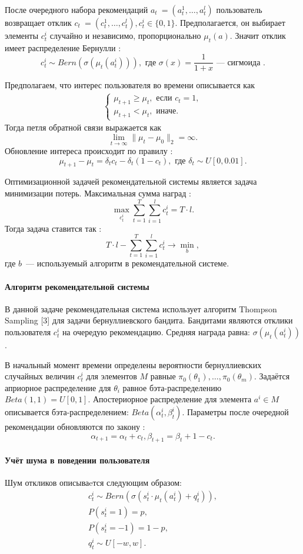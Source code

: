 \documentclass[12pt, twoside]{article}
\begin{document}
После очередного набора рекомендаций $a_t~= (a_t^1, \dots, a_t^l)$ пользователь возвращает $\textit{отклик}$ $c_t~= (c_t^1, \dots, c_t^l), c_t^i \in \{0, 1\}$. 
Предполагается, он выбирает элементы $c_t^i$ случайно и независимо, пропорционально $\mu_t(a)$.
Значит отклик имеет распределение Бернулли : 
\[c_t^i \sim Bern (\sigma(\mu_t(a_t^i))), \text{ где } \sigma(x) = \frac{1}{1+x}\text{~--- сигмоида }. \] 

Предполагаем, что интерес пользователя во времени описывается как 
\begin{gather*}
  \begin{cases}
    \mu_{t+1} \geq \mu_{t}, \text{ если } c_t = 1,  \\
    \mu_{t+1} < \mu_{t}, \text{ иначе}. 
  \end{cases}
\end{gather*}
Тогда петля обратной связи выражается как \[ \lim_{t \to \infty} \|\mu_t - \mu_0 \|_2 = \infty. \]
Обновление интереса происходит по правилу : 
\[\mu_{t+1} - \mu_{t} = \delta_t c_t - \delta_t (1 - c_t), \text{ где } \delta_t \sim U[0, 0.01].\]

Оптимизационной задачей рекомендательной системы является задача минимизации потерь. 
Максимальная сумма наград : \[ \max_{c_t^i} \sum_{t = 1}^T \sum_{i = 1}^l c_t^i = T \cdot l.\] 
Тогда задача ставится так : 
\[
  T \cdot l - \sum_{t = 1}^T \sum_{i = 1}^l c_t^i \to \min_{b}, 
\]
где $b$~--- используемый алгоритм в рекомендательной системе. 

\paragraph{Алгоритм рекомендательной системы}
В данной задаче рекомендательная система использует алгоритм Thompson Sampling [3] для задачи бернуллиевского бандита.  
Бандитами являются отклики пользователя $c_t^i$ на очередую рекомендацию.
Средняя награда равна: $\sigma(\mu_t(a_t^i))$.

В начальный момент времени определены вероятности бернуллиевских случайных величин $c_t^i$ для элементов $M$ равные $\pi_0(\theta_1), \dots, \pi_0(\theta_m)$. 
Задаётся априорное распределение для $\theta_i$ равное бэта-распределению $Beta(1, 1) = U[0, 1]$. 
Апостериорное распределение для элемента $a^i \in M$ описывается бэта-распределением: $Beta(\alpha_t^i, \beta_t^i)$. 
Параметры после очередной рекомендации обновляются по закону :
\[\alpha_{t+1} = \alpha_t + c_t, \beta_{t+1} = \beta_t + 1 - c_t.\]

\paragraph{Учёт шума в поведении пользователя}
Шум откликов описываeтся следующим образом: 
\begin{gather*}
  c_t^i \sim Bern \left(\sigma(s_t^i \cdot \mu_t(a_t^i) + q_t^i) \right), \\
  P(s_t^i = 1) = p, \\ P(s_t^i = -1) = 1 - p, \\
  q_t^i \sim U[-w, w].
\end{gather*}
\end{document}
